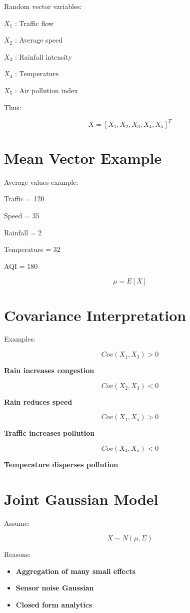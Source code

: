 \documentclass[12pt]{article}
\begin{document}
Random vector variables:

$X_1$ : Traffic flow

$X_2$ : Average speed

$X_3$ : Rainfall intensity

$X_4$ : Temperature

$X_5$ : Air pollution index

Thus:

\[
\boxed{X = [X_1, X_2, X_3, X_4, X_5]^T}
\]

\section{Mean Vector Example}

Average values example:

Traffic = 120

Speed = 35

Rainfall = 2

Temperature = 32

AQI = 180

\[
\boxed{\mu = E[X]}
\]

\section{Covariance Interpretation}

Examples:

\[
Cov(X_1,X_3) > 0
\]

\textbf{Rain increases congestion}

\[
Cov(X_2,X_3) < 0
\]

\textbf{Rain reduces speed}

\[
Cov(X_1,X_5) > 0
\]

\textbf{Traffic increases pollution}

\[
Cov(X_4,X_5) < 0
\]

\textbf{Temperature disperses pollution}

\section{Joint Gaussian Model}

Assume:

\[
\boxed{X \sim N(\mu, \Sigma)}
\]

Reasons:

\begin{itemize}
\item \textbf{Aggregation of many small effects}
\item \textbf{Sensor noise Gaussian}
\item \textbf{Closed form analytics}
\end{itemize}
\end{document}
